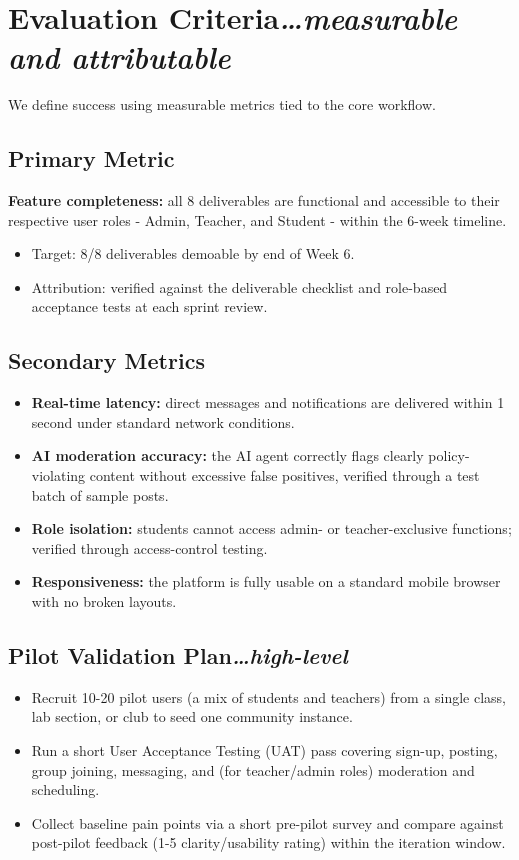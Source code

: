 \documentclass[11pt,a4paper]{article}
\newcommand{\BvrHint}[1]{{\normalfont\normalsize\itshape\hfill #1}}
\begin{document}
\section{Evaluation Criteria\BvrHint{\ldots measurable and attributable}}

We define success using measurable metrics tied to the core workflow.

\subsection{Primary Metric}
\textbf{Feature completeness:} all 8 deliverables are functional and accessible to their respective user roles - Admin, Teacher, and Student - within the 6-week timeline.
\begin{itemize}[leftmargin=0.7cm]
    \item Target: 8/8 deliverables demoable by end of Week 6.
    \item Attribution: verified against the deliverable checklist and role-based acceptance tests at each sprint review.
\end{itemize}

\subsection{Secondary Metrics}
\begin{itemize}[leftmargin=0.7cm]
    \item \textbf{Real-time latency:} direct messages and notifications are delivered within 1 second under standard network conditions.
    \item \textbf{AI moderation accuracy:} the AI agent correctly flags clearly policy-violating content without excessive false positives, verified through a test batch of sample posts.
    \item \textbf{Role isolation:} students cannot access admin- or teacher-exclusive functions; verified through access-control testing.
    \item \textbf{Responsiveness:} the platform is fully usable on a standard mobile browser with no broken layouts.
\end{itemize}

\subsection{Pilot Validation Plan\BvrHint{\ldots high-level}}
\begin{itemize}[leftmargin=0.7cm]
    \item Recruit 10-20 pilot users (a mix of students and teachers) from a single class, lab section, or club to seed one community instance.
    \item Run a short User Acceptance Testing (UAT) pass covering sign-up, posting, group joining, messaging, and (for teacher/admin roles) moderation and scheduling.
    \item Collect baseline pain points via a short pre-pilot survey and compare against post-pilot feedback (1-5 clarity/usability rating) within the iteration window.
\end{itemize}
\end{document}
